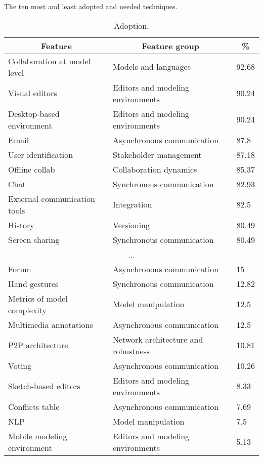 
  \begin{table*}[]
  \caption{The ten most and least adopted and needed techniques.}
  \label{tab:top-bottom-need}
  \begin{subtable}[c]{0.5\textwidth}
  \centering
  \notsotiny
  \caption{Adoption.}
  \label{tab:top-bottom-current}
  \begin{tabular}{@{}lll@{}}
  \toprule
  \multicolumn{1}{c}{\textbf{Feature}} & \multicolumn{1}{c}{\textbf{Feature group}} & \multicolumn{1}{c}{\textbf{\%}} \\
  \midrule
  Collaboration at model level & Models and languages & 92.68 \\ 
Visual editors & Editors and modeling environments & 90.24 \\ 
Desktop-based environment & Editors and modeling environments & 90.24 \\ 
Email & Asynchronous communication & 87.8 \\ 
User identification & Stakeholder management & 87.18 \\ 
Offline collab & Collaboration dynamics & 85.37 \\ 
Chat & Synchronous communication & 82.93 \\ 
External communication tools & Integration & 82.5 \\ 
History & Versioning & 80.49 \\ 
Screen sharing & Synchronous communication & 80.49 \\ 
\multicolumn{3}{c}{...} \\ 
Forum & Asynchronous communication & 15 \\ 
Hand gestures & Synchronous communication & 12.82 \\ 
Metrics of model complexity & Model manipulation & 12.5 \\ 
Multimedia annotations & Asynchronous communication & 12.5 \\ 
P2P architecture & Network architecture and robustness & 10.81 \\ 
Voting & Asynchronous communication & 10.26 \\ 
Sketch-based editors & Editors and modeling environments & 8.33 \\ 
Conflicts table & Asynchronous communication & 7.69 \\ 
NLP & Model manipulation & 7.5 \\ 
Mobile modeling environment & Editors and modeling environments & 5.13 \\ 

\end{tabular}
\end{subtable}
\end{table*}
